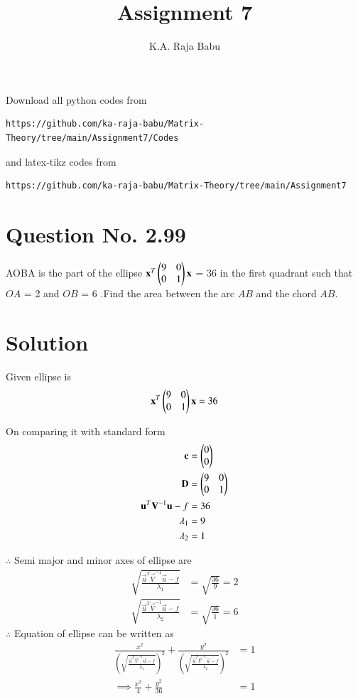 \documentclass[journal,12pt,twocolumn]{IEEEtran}
\begin{document}
     \def\rightbox#1{\makebox[0in][r]{#1}}
     \def\centbox#1{\makebox[0in]{#1}}
     \def\topbox#1{\raisebox{-\baselineskip}[0in][0in]{#1}}
     \def\midbox#1{\raisebox{-0.5\baselineskip}[0in][0in]{#1}}
\vspace{3cm}
\title{Assignment 7}
\author{K.A. Raja Babu}
\maketitle
\newpage
\bigskip
\renewcommand{\thefigure}{\theenumi}
\renewcommand{\thetable}{\theenumi}
Download all python codes from 
\begin{lstlisting}
https://github.com/ka-raja-babu/Matrix-Theory/tree/main/Assignment7/Codes
\end{lstlisting}
%
and latex-tikz codes from 
%
\begin{lstlisting}
https://github.com/ka-raja-babu/Matrix-Theory/tree/main/Assignment7
\end{lstlisting}
%
\section{Question No. 2.99}
AOBA is the part of the ellipse $\mathbf{x}^T\begin{pmatrix}9 & 0 \\ 0 & 1\end{pmatrix}\mathbf{x}$ = 36 in the first quadrant such that $OA$ = 2 and $OB$ = 6 .Find the area between the arc $AB$ and the chord $AB$.
%
\section{Solution}
Given ellipse is 
\begin{align}
    \mathbf{x}^T\begin{pmatrix}9 & 0 \\ 0 & 1\end{pmatrix}\mathbf{x} = 36 
\end{align}

On comparing it with standard form
\begin{align}
    \mathbf{c} &= \begin{pmatrix}0 \\ 0\end{pmatrix}
    \\
    \mathbf{D} &= \begin{pmatrix}9 & 0 \\ 0 & 1\end{pmatrix}
    \\
    \mathbf{u}^T\mathbf{V}^{-1}\mathbf{u} - f &= 36
    \\
    \lambda_1 &= 9 
    \\
    \lambda_2 &= 1
\end{align}

$\therefore$  Semi major and minor axes of ellipse are
\begin{align}
    \sqrt{\frac{ \vec{u}^T\vec{V}^{-1}\vec{u} - f}{\lambda_1}} &= \sqrt{\frac{36}{9}} = 2
    \\
    \sqrt{\frac{ \vec{u}^T\vec{V}^{-1}\vec{u} - f}{\lambda_2}} &= \sqrt{\frac{36}{1}} = 6
\end{align}
$\therefore$ Equation of ellipse can be written as
\begin{align}
    \frac{x^2}{(\sqrt{\frac{ \vec{u}^T\vec{V}^{-1}\vec{u} - f}{\lambda_1}})^2} + \frac{y^2}{(\sqrt{\frac{ \vec{u}^T\vec{V}^{-1}\vec{u} - f}{\lambda_2}})^2} &= 1
    \\
    \implies \frac{x^2}{4} + \frac{y^2}{36} &= 1
\end{align}
\end{document}
